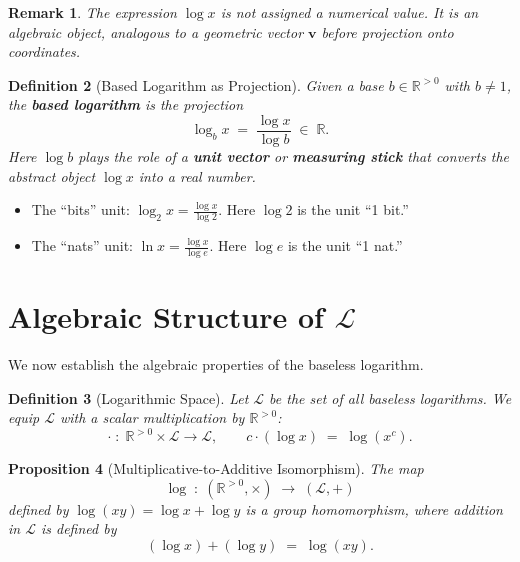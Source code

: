 \documentclass[11pt]{article}
\newtheorem{definition}{Definition}[section]
\newtheorem{proposition}[definition]{Proposition}
\newtheorem{remark}[definition]{Remark}
\begin{document}
\begin{remark}
The expression $\log x$ is not assigned a numerical value. It is an algebraic object, analogous to a geometric vector $\mathbf{v}$ before projection onto coordinates.
\end{remark}

\begin{definition}[Based Logarithm as Projection]
\label{def:based}
Given a base $b \in \mathbb{R}^{>0}$ with $b \neq 1$, the \textbf{based logarithm} is the projection
\[
\log_b x \;=\; \frac{\log x}{\log b} \;\in\; \mathbb{R}.
\]
Here $\log b$ plays the role of a \textbf{unit vector} or \textbf{measuring stick} that converts the abstract object $\log x$ into a real number.
\end{definition}

\begin{example}
\begin{itemize}
\item The ``bits'' unit: $\log_2 x = \frac{\log x}{\log 2}$. Here $\log 2$ is the unit ``1 bit.''
\item The ``nats'' unit: $\ln x = \frac{\log x}{\log e}$. Here $\log e$ is the unit ``1 nat.''
\end{itemize}
\end{example}

\section{Algebraic Structure of $\mathcal{L}$}
\label{sec:structure}

We now establish the algebraic properties of the baseless logarithm.

\begin{definition}[Logarithmic Space]
\label{def:logspace}
Let $\mathcal{L}$ be the set of all baseless logarithms. We equip $\mathcal{L}$ with a scalar multiplication by $\mathbb{R}^{>0}$:
\[
\cdot \;:\; \mathbb{R}^{>0} \times \mathcal{L} \to \mathcal{L}, \qquad c \cdot (\log x) \;=\; \log(x^c).
\]
\end{definition}

\begin{proposition}[Multiplicative-to-Additive Isomorphism]
\label{prop:isomorphism}
The map
\[
\log \;:\; (\mathbb{R}^{>0}, \times) \;\to\; (\mathcal{L}, +)
\]
defined by $\log(xy) = \log x + \log y$ is a group homomorphism, where addition in $\mathcal{L}$ is defined by
\[
(\log x) + (\log y) \;=\; \log(xy).
\]
\end{proposition}
\end{document}
